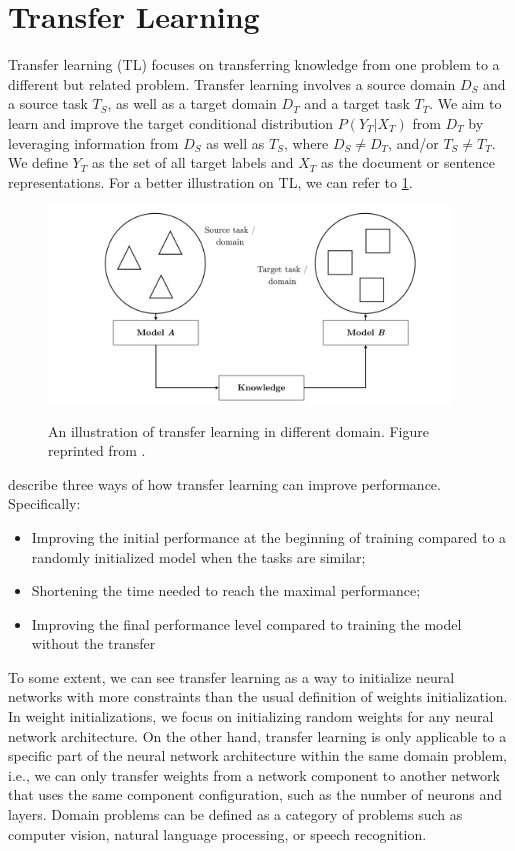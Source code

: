 \section{Transfer Learning}
\label{sec:bm_tl}
Transfer learning (TL) focuses on transferring knowledge from one problem to a different but related problem. Transfer learning involves a source domain $D_S$ and a source task $T_S$, as well as a target domain $D_T$ and a target task $T_T$. We aim to learn and improve the target conditional distribution $P(Y_T|X_T)$ from $D_T$ by leveraging information from $D_S$ as well as $T_S$, where $D_S \neq D_T$, and/or $T_S \neq T_T$. We define $Y_T$ as the set of all target labels and $X_T$ as the document or sentence representations. For a better illustration on TL, we can refer to \cref{img:transfer_learning}.

\begin{figure}[h]
    {\includegraphics[width=0.95\textwidth]{img/transfer_learning_scenario.png}}
    \centering
    \caption{An illustration of transfer learning in different domain. Figure reprinted from .}
    \label{img:transfer_learning}
\end{figure}

 describe three ways of how transfer learning can improve performance. Specifically:
\begin{itemize}
    \item Improving the initial performance at the beginning of training compared
          to a randomly initialized model when the tasks are similar;
    \item Shortening the time needed to reach the maximal performance;
    \item Improving the final performance level compared to training the model
          without the transfer
\end{itemize}

To some extent, we can see transfer learning as a way to initialize neural networks with more constraints than the usual definition of weights initialization. In weight initializations, we focus on initializing random weights for any neural network architecture. On the other hand, transfer learning is only applicable to a specific part of the neural network architecture within the same domain problem, i.e., we can only transfer weights from a network component to another network that uses the same component configuration, such as the number of neurons and layers. Domain problems can be defined as a category of problems such as computer vision, natural language processing, or speech recognition.

